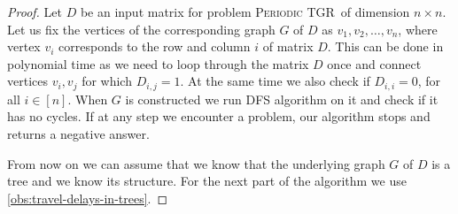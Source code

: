 \documentclass[a4paper,UKenglish,cleveref, autoref, thm-restate]{lipics-v2021}
\newcommand{\deltaExact}{\textsc{Periodic TGR}}
\begin{document}
\begin{proof}
    Let $D$ be an input matrix for problem \deltaExact\ of dimension $n \times n$.
    Let us fix the vertices of the corresponding graph $G$ of $D$ as $v_1, v_2, \dots, v_n$, where vertex $v_i$ corresponds to the row and column $i$ of matrix $D$.
    This can be done in polynomial time as we need to loop through the matrix $D$ once and connect vertices $v_i, v_j$ for which $D_{i,j} = 1$. At the same time we also check if $D_{i,i} = 0$, for all $i \in [n]$.
    When $G$ is constructed we run DFS algorithm on it and check if it has no cycles.
    If at any step we encounter a problem, our algorithm stops and returns a negative answer.
    
    From now on we can assume that we know that the underlying graph $G$ of $D$ is a tree and we know its structure.
    For the next part of the algorithm we use \cref{obs:travel-delays-in-trees}.
    

\end{proof}
\end{document}
